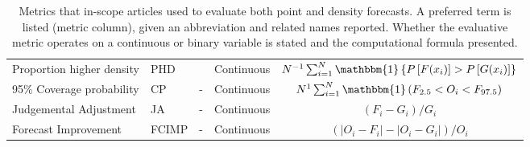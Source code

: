 \documentclass[preprint,authoryear]{elsarticle}
\def\l{\left}
\def\r{\right}
\begin{document}
\begin{sidewaystable}[ht!]
\begin{tabular}{L{4cm}C{3cm}C{4cm}cc}
    Proportion higher density & PHD       &  & Continuous & $N^{-1} \sum_{i=1}^{N} \mathbbm{1} \l\{ P\l[F(x_{i})\r] > P\l[G(x_{i})\r] \r\}$\\
    95\% Coverage probability & CP      & - & Continuous & $N^{1} \sum_{i=1}^{N} \mathbbm{1}\l( F_{2.5} < O_{i} < F_{97.5} \r)$ \\
    Judgemental Adjustment & JA        & - & Continuous & $\l(F_{i} - G_{i} \r)\Big/ G_{i}$ \\
    Forecast Improvement & FCIMP        & - & Continuous & $\l(|O_{i}-F_{i}| - |O_{i} - G_{i}| \r)\Big/ O_{i}$\\
    \hline
\end{tabular}
\caption{
\normalsize Metrics that in-scope articles used to evaluate both point and density forecasts.
A preferred term is listed (metric column), given an abbreviation and related names reported.
Whether the evaluative metric operates on a continuous or binary variable is stated and the computational formula presented. 
\label{tbl.metrics}}
\end{sidewaystable}
\end{document}
